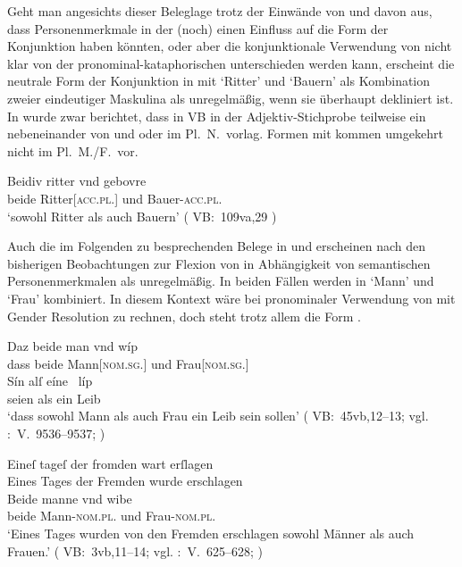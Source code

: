 Geht man angesichts dieser Beleglage trotz der Einwände von
\citet{gjelsten1980} und \citet{ksw2} davon aus, dass Personenmerkmale in der
\KC{} (noch) einen Einfluss auf die Form der Konjunktion haben
könnten, oder aber die konjunktionale Verwendung von  nicht
klar von der pronominal-kataphorischen unterschieden werden kann, erscheint
die neutrale Form der Konjunktion in  mit 
`Ritter' und  `Bauern' als Kombination zweier
eindeutiger Maskulina als unregelmäßig, wenn sie überhaupt dekliniert ist. In
 wurde zwar berichtet, dass in VB in der
Adjektiv-Stichprobe teilweise ein nebeneinander von  und 
oder  im Pl.~N.\ vorlag. Formen mit  kommen umgekehrt
nicht im Pl.~M./F.\ vor.

\begin{exe}
\ex\label{ex:rittergebure}
	\gll Beidiv ritter vnd gebovre \\
		beide Ritter[\textsc{acc.pl.\MascM}] und Bauer-\textsc{acc.pl.\MascM} \\
	\trans `sowohl Ritter als auch Bauern'
		(%
			VB:~109va,29%
		)
\end{exe}

Auch die im Folgenden zu besprechenden Belege in  und
 erscheinen nach den bisherigen Beobachtungen zur
Flexion von  in Abhängigkeit von semantischen Personenmerkmalen
als unregelmäßig. In beiden Fällen werden in 
`Mann' und `Frau' kombiniert. In diesem Kontext wäre bei pronominaler
Verwendung von  mit Gender Resolution zu rechnen, doch steht
trotz allem die Form .

\begin{exe}
\ex \label{ex:konjmixbeide1}
	\begin{xlist}
	\ex \gll Daz beide man vnd wíp \\
			dass beide Mann[\textsc{nom.sg.\MascM}] und Frau[\textsc{nom.sg.\NeutF}] \\
	\sn \gll Sín alſ eíne~ líp \\
			seien als ein Leib \\
		\trans `dass sowohl Mann als auch Frau ein Leib sein sollen'
			(%
				VB:~45vb,12--13; vgl.
				\KC:~V.~9536--9537;
				\cite[257]{schroeder1895}
			)
		\label{ex:konjmixbeide1_1}

	\ex \label{ex:konjmixbeide1_2}
		\gll Eineſ tageſ der fromden wart erſlagen \\
			Eines Tages der Fremden wurde erschlagen \\
		\textelp{}
	\sn \gll Beide manne vnd wibe \\
			beide Mann-\textsc{nom.pl.\MascM} und Frau-\textsc{nom.pl.\NeutF} \\
		\trans `Eines Tages wurden von den Fremden erschlagen \textelp{} 
			sowohl Männer als auch Frauen.'
			(%
				VB:~3vb,11--14; vgl.
				\KC:~V.~625--628;
				\cite[93]{schroeder1895}%
			)
	\end{xlist}
\end{exe}

